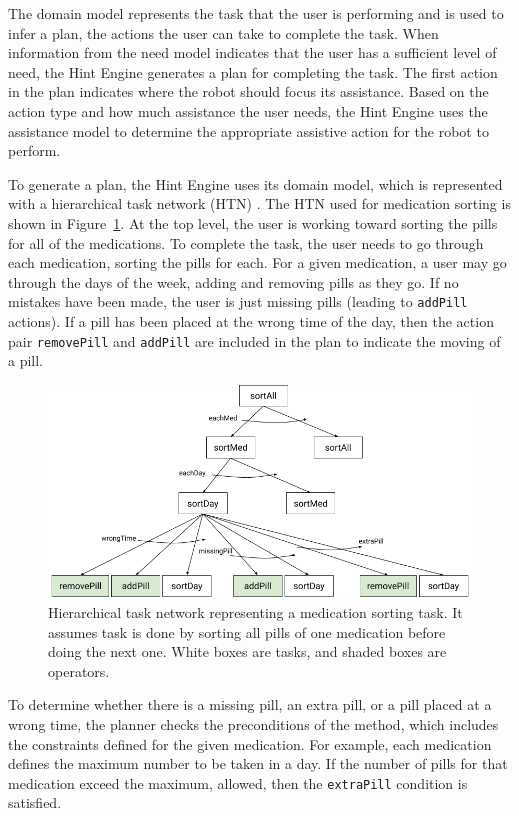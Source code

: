 \documentclass[letterpaper]{article} %
\begin{document}
The domain model represents the task that the user is performing and is used to infer a plan, the actions the user can take to complete the task.  When information from the need model indicates that the user has a sufficient level of need, the Hint Engine generates a plan for completing the task.  The first action in the plan indicates where the robot should focus its assistance.  Based on the action type and how much assistance the user needs, the Hint Engine uses the assistance model to determine the appropriate assistive action for the robot to perform.

To generate a plan, the Hint Engine uses its domain model, which is represented with a hierarchical task network (HTN) \cite{nau1999shop}.  The HTN used for medication sorting is shown in Figure~\ref{fig:htn}.  At the top level, the user is working toward sorting the pills for all of the medications.  To complete the task, the user needs to go through each medication, sorting the pills for each. For a given medication, a user may go through the days of the week, adding and removing pills as they go.  If no mistakes have been made, the user is just missing pills (leading to \texttt{addPill} actions).  If a pill has been placed at the wrong time of the day, then the action pair \texttt{removePill} and \texttt{addPill} are included in the plan to indicate the moving of a pill.

\begin{figure}[h]
\centering
\includegraphics[width=0.99\columnwidth]{medsorting_htn.png} 
\caption{Hierarchical task network representing a medication sorting task. It assumes task is done by sorting all pills of one medication before doing the next one. White boxes are tasks, and shaded boxes are operators.  }
\label{fig:htn}
\end{figure}

To determine whether there is a missing pill, an extra pill, or a pill placed at a wrong time, the planner %
checks the preconditions of the method, which includes the constraints defined for the given medication.  For example, each medication defines the maximum number to be taken in a day.  If the number of pills for that medication exceed the maximum, allowed, then the \texttt{extraPill} condition is satisfied.
\end{document}
